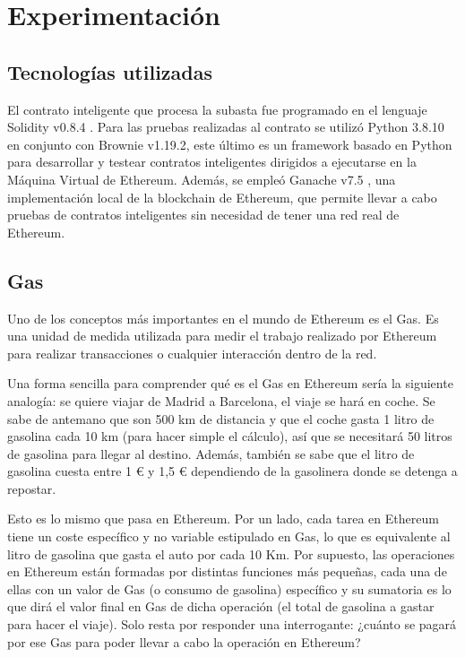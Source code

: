   \section{Experimentación}
  \subsection{Tecnologías utilizadas}
    El contrato inteligente que procesa la subasta fue programado en el lenguaje Solidity v0.8.4 
    \parencite{solidity0.8.4}. Para las pruebas realizadas al contrato se utilizó Python 3.8.10 
    \parencite{python3.8} en conjunto con Brownie v1.19.2, este último es un framework basado en Python
    para desarrollar y testear contratos inteligentes dirigidos a ejecutarse en la Máquina Virtual de 
    Ethereum. Además, se empleó Ganache v7.5 \parencite{ganache7.5}, una implementación local de la blockchain de Ethereum, que permite llevar a cabo pruebas de contratos inteligentes sin necesidad de tener una red
    real de Ethereum.

    \subsection{Gas}
      Uno de los conceptos más importantes en el mundo de Ethereum es el Gas. Es una unidad de medida utilizada para medir el trabajo realizado por Ethereum para realizar transacciones o 
      cualquier interacción dentro de la red.


      Una forma sencilla para comprender qué es el Gas en Ethereum sería la siguiente analogía: se quiere viajar 
      de Madrid a Barcelona, el viaje se hará en coche. Se sabe de antemano que son 
      500 km de distancia y que el coche gasta 1 litro de gasolina cada 10 km (para hacer simple el cálculo), 
      así que se necesitará 50 litros de gasolina para llegar al destino. Además, también se sabe que el 
      litro de gasolina cuesta entre 1 € y 1,5 € dependiendo de la gasolinera donde se detenga a repostar.


      Esto es lo mismo que pasa en Ethereum. Por un lado, cada tarea en Ethereum tiene un coste específico 
      y no variable estipulado en Gas, lo que es equivalente al litro de gasolina que gasta el auto por cada 
      10 Km. Por supuesto, las operaciones en Ethereum están formadas por distintas funciones más pequeñas, 
      cada una de ellas con un valor de Gas (o consumo de gasolina) específico y su sumatoria es lo que 
      dirá el valor final en Gas de dicha operación (el total de gasolina a gastar para hacer el viaje).
      Solo resta por responder una interrogante: ¿cuánto se pagará por ese Gas para poder llevar a cabo la operación en Ethereum?

